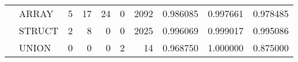 \begin{tabular}{llrrrrrrrr}
      & ARRAY &                                  5 &                                17 &                               24 &                                 0 &                            2092 &                        0.986085 &                               0.997661 &                             0.978485 \\
      & STRUCT &                                  2 &                                 8 &                                0 &                                 0 &                            2025 &                        0.996069 &                               0.999017 &                             0.995086 \\
      & UNION &                                  0 &                                 0 &                                0 &                                 2 &                              14 &                        0.968750 &                               1.000000 &                             0.875000 \\
\bottomrule
\end{tabular}
